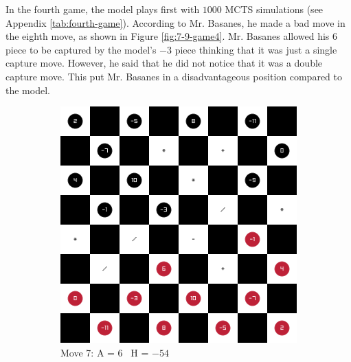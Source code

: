 In the fourth game, the model plays first with $1000$ MCTS simulations (see Appendix \ref{tab:fourth-game}). According to Mr. Basanes, he made a bad move in the eighth move, as shown in Figure \ref{fig:7-9-game4}. Mr. Basanes allowed his 6 piece to be captured by the model's $-3$ piece thinking that it was just a single capture move. However, he said that he did not notice that it was a double capture move. This put Mr. Basanes in a disadvantageous position compared to the model.

\begin{figure}[H]
\centering
    \begin{subfigure}{0.3\textwidth}
        \centering
        \includegraphics[width=\textwidth]{images/games/game4/move_7.png}
        \caption*{Move 7: A = 6 \textbar\ H = $-54$}
    \end{subfigure}
    \quad
    \begin{subfigure}{0.3\textwidth}
        \centering

\end{subfigure}
\end{figure}
